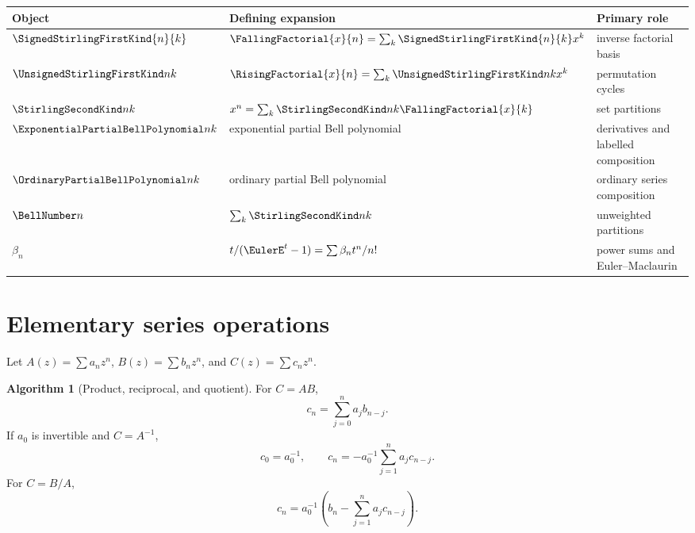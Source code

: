 \documentclass[11pt,a4paper,oneside,openany]{book}
\theoremstyle{definition}
\newtheorem{algorithm}[theorem]{Algorithm}
\theoremstyle{remark}
\begin{document}
\begin{center}
\renewcommand{\arraystretch}{1.18}
\begin{tabularx}{\textwidth}{@{}>{\bfseries}l X X@{}}
\toprule
Object & Defining expansion & Primary role\\
\midrule
$\SignedStirlingFirstKind{n}{k}$ & $\FallingFactorial{x}{n}=\sum_k\SignedStirlingFirstKind{n}{k}x^k$ & inverse factorial basis\\
$\UnsignedStirlingFirstKind nk$ & $\RisingFactorial{x}{n}=\sum_k\UnsignedStirlingFirstKind nkx^k$ & permutation cycles\\
$\StirlingSecondKind nk$ & $x^n=\sum_k\StirlingSecondKind nk\FallingFactorial{x}{k}$ & set partitions\\
$\ExponentialPartialBellPolynomial nk$ & exponential partial Bell polynomial & derivatives and labelled composition\\
$\OrdinaryPartialBellPolynomial nk$ & ordinary partial Bell polynomial & ordinary series composition\\
$\BellNumber n$ & $\sum_k\StirlingSecondKind nk$ & unweighted partitions\\
$\beta_n$ & $t/(\EulerE^t-1)=\sum\beta_nt^n/n!$ & power sums and Euler--Maclaurin\\
\bottomrule
\end{tabularx}
\renewcommand{\arraystretch}{1}
\end{center}

\section{Elementary series operations}

Let $A(z)=\sum a_nz^n$, $B(z)=\sum b_nz^n$, and $C(z)=\sum c_nz^n$.

\begin{algorithm}[Product, reciprocal, and quotient]
\label{alg:merged-product-quotient}
For $C=AB$,
\begin{equation}
 c_n=\sum_{j=0}^{n}a_jb_{n-j}.                                     \label{eq:merged-alg-product}
\end{equation}
If $a_0$ is invertible and $C=A^{-1}$,
\begin{equation}
 c_0=a_0^{-1},\qquad
 c_n=-a_0^{-1}\sum_{j=1}^{n}a_jc_{n-j}.                            \label{eq:merged-alg-reciprocal}
\end{equation}
For $C=B/A$,
\begin{equation}
 c_n=a_0^{-1}\left(b_n-\sum_{j=1}^{n}a_jc_{n-j}\right).            \label{eq:merged-alg-quotient}
\end{equation}
\end{algorithm}
\end{document}
